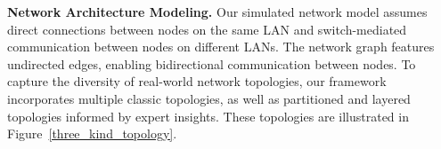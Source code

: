 \textbf{Network Architecture Modeling.}
Our simulated network model assumes direct connections between nodes on the same LAN and switch-mediated communication between nodes on different LANs. The network graph features undirected edges, enabling bidirectional communication between nodes. To capture the diversity of real-world network topologies, our framework incorporates multiple classic topologies, as well as partitioned and layered topologies informed by expert insights. These topologies are illustrated in Figure~\ref{three_kind_topology}.


